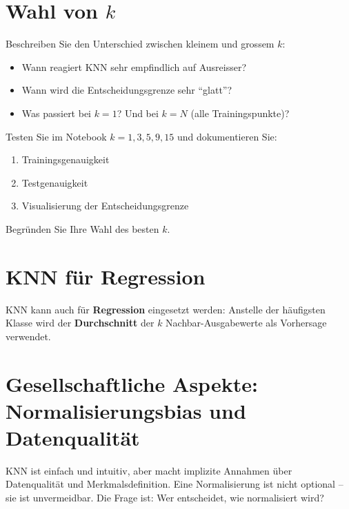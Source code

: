 \section{Wahl von \texorpdfstring{$k$}{k}}

\begin{myexercise}
    Beschreiben Sie den Unterschied zwischen kleinem und grossem $k$:
    \begin{itemize}
        \item Wann reagiert KNN sehr empfindlich auf Ausreisser?
        \item Wann wird die Entscheidungsgrenze sehr \enquote{glatt}?
        \item Was passiert bei $k = 1$? Und bei $k = N$ (alle Trainingspunkte)?
    \end{itemize}
\end{myexercise}

\begin{mychallenge}
    Testen Sie im Notebook $k = 1, 3, 5, 9, 15$ und dokumentieren Sie:
    \begin{enumerate}
        \item Trainingsgenauigkeit
        \item Testgenauigkeit
        \item Visualisierung der Entscheidungsgrenze
    \end{enumerate}
    Begründen Sie Ihre Wahl des besten $k$.
\end{mychallenge}

\section{KNN für Regression}

KNN kann auch für \textbf{Regression} eingesetzt werden:
Anstelle der häufigsten Klasse wird der \textbf{Durchschnitt} der $k$ Nachbar-Ausgabewerte
als Vorhersage verwendet.
\section{Gesellschaftliche Aspekte: Normalisierungsbias und Datenqualität}

\begin{mydefinition}
    KNN ist einfach und intuitiv, aber macht implizite Annahmen über Datenqualität und Merkmalsdefinition. Eine Normalisierung ist nicht optional -- sie ist unvermeidbar. Die Frage ist: Wer entscheidet, wie normalisiert wird?
\end{mydefinition}

